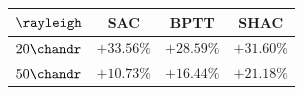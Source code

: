 \begin{tabular}{lccc}
\toprule
$\rayleigh$ & SAC & BPTT & SHAC \\
\midrule
$20\chandr$ & $\mathbf{+33.56}\%$ & $+28.59\%$ & $+31.60\%$ \\
$50\chandr$ & $+10.73\%$ & $+16.44\%$ & $\mathbf{+21.18}\%$ \\
\bottomrule
\end{tabular}
